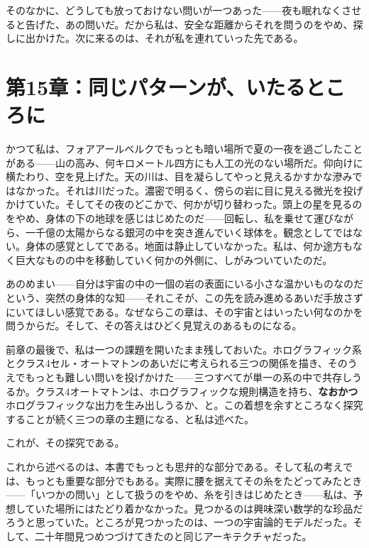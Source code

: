 \documentclass[11pt, twoside, openright]{book}
\begin{document}
そのなかに、どうしても放っておけない問いが一つあった------夜も眠れなくさせると告げた、あの問いだ。だから私は、安全な距離からそれを問うのをやめ、探しに出かけた。次に来るのは、それが私を連れていった先である。


\chapter*{第15章：同じパターンが、いたるところに}

かつて私は、フォアアールベルクでもっとも暗い場所で夏の一夜を過ごしたことがある------山の高み、何キロメートル四方にも人工の光のない場所だ。仰向けに横たわり、空を見上げた。天の川は、目を凝らしてやっと見えるかすかな滲みではなかった。それは川だった。濃密で明るく、傍らの岩に目に見える微光を投げかけていた。そしてその夜のどこかで、何かが切り替わった。頭上の星を見るのをやめ、身体の下の地球を感じはじめたのだ------回転し、私を乗せて運びながら、一千億の太陽からなる銀河の中を突き進んでいく球体を。観念としてではない。身体の感覚としてである。地面は静止していなかった。私は、何か途方もなく巨大なものの中を移動していく何かの外側に、しがみついていたのだ。

あのめまい------自分は宇宙の中の一個の岩の表面にいる小さな温かいものなのだという、突然の身体的な知------それこそが、この先を読み進めるあいだ手放さずにいてほしい感覚である。なぜならこの章は、その宇宙とはいったい何なのかを問うからだ。そして、その答えはひどく見覚えのあるものになる。


前章の最後で、私は一つの課題を開いたまま残しておいた。ホログラフィック系とクラス4セル・オートマトンのあいだに考えられる三つの関係を描き、そのうえでもっとも難しい問いを投げかけた------三つすべてが単一の系の中で共存しうるか。クラス4オートマトンは、ホログラフィックな規則構造を持ち、\textbf{なおかつ}ホログラフィックな出力を生み出しうるか、と。この着想を余すところなく探究することが続く三つの章の主題になる、と私は述べた。

これが、その探究である。

これから述べるのは、本書でもっとも思弁的な部分である。そして私の考えでは、もっとも重要な部分でもある。実際に腰を据えてその糸をたどってみたとき------「いつかの問い」として扱うのをやめ、糸を引きはじめたとき------私は、予想していた場所にはたどり着かなかった。見つかるのは興味深い数学的な珍品だろうと思っていた。ところが見つかったのは、一つの宇宙論的モデルだった。そして、二十年間見つめつづけてきたのと同じアーキテクチャだった。
\end{document}
